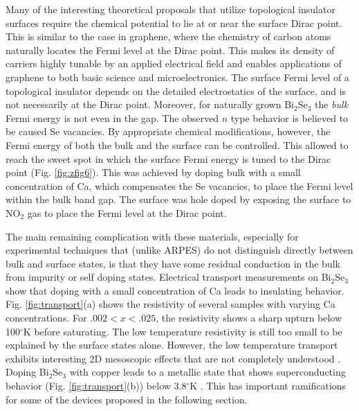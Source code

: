 \documentclass[twocolumn,floatfix,showpacs,rmp,aps]{revtex4}
\begin{document}
Many of the interesting theoretical proposals that utilize
topological insulator surfaces
require the chemical potential to lie at or near the surface Dirac point.
This is similar to the case in graphene, where
the chemistry of carbon atoms naturally locates the Fermi
level at the Dirac point.   This makes its
density of carriers highly tunable by an applied electrical field and
enables applications of graphene to both basic science and
microelectronics.  The surface Fermi level of a topological insulator
depends on the detailed electrostatics of the surface, and is not necessarily
at the Dirac point.  Moreover, for naturally grown Bi$_2$Se$_3$ the {\it bulk} Fermi
energy is not even in the gap.  The observed $n$ type behavior is believed to
be caused Se vacancies.  By appropriate chemical modifications, however, the
Fermi energy of both the bulk and the surface can be controlled.
This allowed \textcite{hsieh09b} to reach the sweet spot in which the surface
Fermi energy is tuned to the Dirac point (Fig. \ref{fig:zfig6}).  This
was achieved by doping bulk
with a small concentration of Ca,
which compensates the Se vacancies, to place the Fermi level within
the bulk band gap.  The surface was hole doped by exposing the
surface to NO$_2$ gas to place the Fermi level at the Dirac point.

The main remaining complication with these materials, especially for
experimental techniques that (unlike ARPES) do not distinguish
directly between bulk and surface states, is that they have some
residual conduction in the bulk from impurity or self doping states.
Electrical transport measurements on Bi$_2$Se$_3$ show that doping with a small
concentration of Ca leads to insulating behavior.  Fig. \ref{fig:transport}(a)
shows the resistivity of several samples with varying Ca concentrations.  For
$.002<x<.025$, the resistivity shows a sharp upturn below 100$^\circ$K before
saturating.  The low temperature resistivity is still too small to be explained by
the surface states alone.  However, the low temperature transport exhibits
interesting 2D mesoscopic effects that are not completely
understood \cite{checkelsky09}.   Doping Bi$_2$Se$_3$ with copper leads to a
metallic state that shows superconducting behavior (Fig.
\ref{fig:transport}(b)) below 3.8$^\circ$K \cite{hor10a,wray09}.  This has important
ramifications for some of the devices proposed in the following section.
\end{document}

